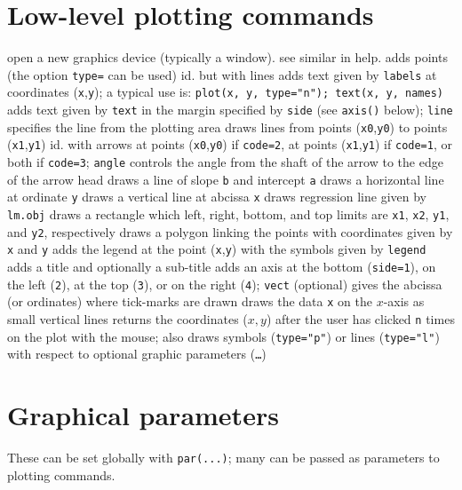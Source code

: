 \section{Low-level plotting commands}{}
	{open a new graphics device (typically a window). see similar in help.}
	{adds points (the option {\tt type=} can be used)}
	{ id. but with lines}
	{ adds text given by {\tt labels} at
    coordinates ({\tt x},{\tt y}); a typical use is: {\tt plot(x, y, type="n");
        text(x, y, names)}}
	{adds text given by {\tt text} in the margin specified by {\tt side} (see {\tt axis()} below); {\tt line} specifies the line from the plotting area}
	{ draws lines from points ({\tt x0},{\tt y0})
    to points ({\tt x1},{\tt y1})}
	{id. with arrows at points ({\tt x0},{\tt y0}) if {\tt code=2}, at points ({\tt x1},{\tt y1}) if {\tt code=1}, or both if {\tt code=3}; {\tt angle} controls the angle from the shaft of the arrow to the edge of the arrow head}
	{draws a line of slope {\tt b} and intercept {\tt a}}
	{ draws a horizontal line at ordinate {\tt y}}
	{ draws a vertical line at abcissa {\tt x}}
	{ draws regression line given by {\tt lm.obj}}
	{ draws a rectangle which left, right, bottom, and top limits are {\tt x1}, {\tt x2}, {\tt y1}, and {\tt y2}, respectively}
	{draws a polygon linking the points with coordinates given by {\tt x} and {\tt y}}
	{ adds the legend at the point ({\tt x},{\tt y}) with the symbols given by {\tt legend}}
	{ adds a title and optionally a sub-title}
	{adds an axis at the bottom ({\tt side=1}), on the left ({\tt 2}), at the top ({\tt 3}), or on the right ({\tt 4}); {\tt vect} (optional) gives the abcissa (or ordinates) where tick-marks are drawn}
	{draws the data {\tt x} on the $x$-axis as small vertical lines}
	{returns the coordinates ($x,y$) after the
    user has clicked {\tt n} times on the plot with the mouse; also draws
    symbols ({\tt type="p"}) or lines ({\tt type="l"}) with respect to optional
    graphic parameters ({\tt \ldots})}

\section{Graphical parameters}{These can be set globally with
{\tt par(...)}; many can be passed as
parameters to plotting commands.}


